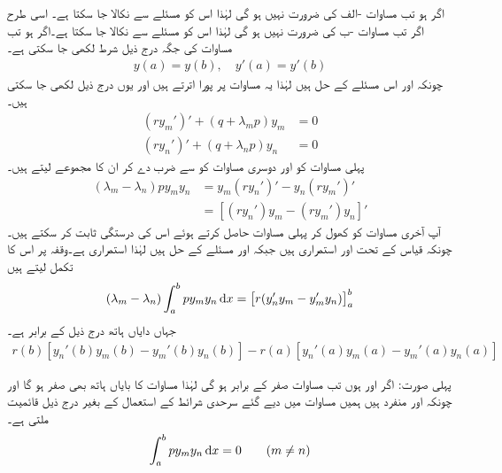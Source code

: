 اگر  ہو تب مساوات -الف کی ضرورت نہیں ہو گی لہٰذا اس کو مسئلے سے نکالا جا سکتا ہے۔ اسی طرح اگر  تب مساوات -ب کی ضرورت نہیں ہو گی لہٰذا اس کو مسئلے سے نکالا جا سکتا ہے۔اگر  ہو تب مساوات  کی جگہ درج ذیل شرط لکھی جا سکتی ہے۔
\begin{align}\label{مساوات_طاقتی_تسلسل_ثبوت_عمودیت_الف}
y(a)=y(b),\quad y'(a)=y'(b)
\end{align}
چونکہ  اور  اس مسئلے کے حل ہیں لہٰذا یہ مساوات  پر پورا اترتے ہیں اور یوں درج ذیل لکھی جا سکتی ہیں۔
\begin{align*}
(ry_m')'+(q+\lambda_m p)y_m&=0\\
(ry_n')'+(q+\lambda_n p)y_n&=0
\end{align*}
پہلی مساوات کو  اور دوسری مساوات کو  سے ضرب دے کر ان کا مجموعے لیتے ہیں۔
\begin{align*}
(\lambda_m-\lambda_n)p y_my_n&=y_m(ry_n')'-y_n(ry_m')'\\
&=[(ry_n')y_m-(ry_m')y_n]'
\end{align*}
آپ آخری مساوات  کو کھول کر پہلی مساوات حاصل کرتے ہوئے اس کی درستگی ثابت کر سکتے ہیں۔چونکہ قیاس کے تحت  اور  استمراری ہیں جبکہ  اور  مسئلے کے حل ہیں لہٰذا  استمراری ہے۔وقفہ  پر اس کا تکمل لیتے ہیں
\begin{align}\label{مساوات_طاقتی_تسلسل_ثبوت_عمودیت_ب}
(\lambda_m-\lambda_n)\int_a^b py_my_n\dif x=\left[r(y_n'y_m-y_m'y_n)\right]_a^b
\end{align}
جہاں دایاں ہاتھ درج ذیل کے برابر ہے۔
\begin{align}\label{مساوات_طاقتی_تسلسل_ثبوت_عمودیت_پ}
r(b)[y_n'(b)y_m(b)-y_m'(b)y_n(b)]-r(a)[y_n'(a)y_m(a)-y_m'(a)y_n(a)]
\end{align}

پہلی صورت: اگر  اور  ہوں تب  مساوات  صفر کے برابر ہو گی لہٰذا مساوات  کا بایاں ہاتھ بھی صفر ہو گا اور چونکہ  اور  منفرد ہیں ہمیں مساوات  میں دیے گئے سرحدی شرائط کے استعمال کے بغیر درج ذیل قائمیت ملتی ہے۔
\begin{align}\label{مساوات_طاقتی_تسلسل_ثبوت_عمودیت_ت}
\int_a^b py_my_n\dif x=0\quad \quad (m\ne n)
\end{align} 

